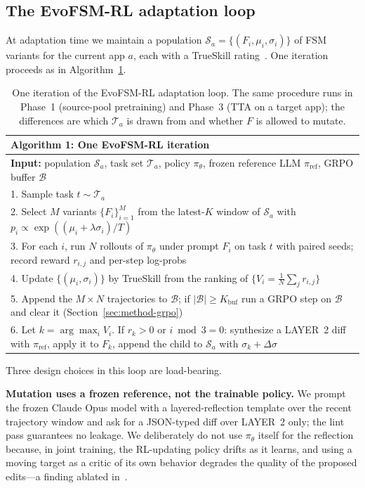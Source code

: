 \subsection{The EvoFSM-RL adaptation loop}
\label{sec:method-loop}

At adaptation time we maintain a population $\mathcal{S}_a = \{(F_i, \mu_i,
\sigma_i)\}$ of FSM variants for the current app $a$, each with a TrueSkill
rating~\citep{herbrich2007trueskill}. One iteration proceeds as in
Algorithm~\ref{alg:evofsmrl}.

\begin{table}[t]
\small
\centering
\begin{tabular}{p{}}
\hline
\textbf{Algorithm 1: One EvoFSM-RL iteration} \\
\hline
\textbf{Input:} population $\mathcal{S}_a$, task set $\mathcal{T}_a$, policy
$\pi_\theta$, frozen reference LLM $\pi_{\text{ref}}$, GRPO buffer $\mathcal{B}$ \\
\hline
1. Sample task $t \sim \mathcal{T}_a$ \\
2. Select $M$ variants $\{F_i\}_{i=1}^M$ from the latest-$K$ window of
$\mathcal{S}_a$ with $p_i \propto \exp((\mu_i + \lambda\sigma_i)/T)$ \\
3. For each $i$, run $N$ rollouts of $\pi_\theta$ under prompt $F_i$ on task $t$
with paired seeds; record reward $r_{i,j}$ and per-step log-probs \\
4. Update $\{(\mu_i, \sigma_i)\}$ by TrueSkill from the ranking of $\{V_i =
\tfrac{1}{N}\sum_j r_{i,j}\}$ \\
5. Append the $M{\times}N$ trajectories to $\mathcal{B}$; if $|\mathcal{B}| \ge
K_{\text{buf}}$ run a GRPO step on $\mathcal{B}$ and clear it
(Section~\ref{sec:method-grpo}) \\
6. Let $k = \arg\max_i V_i$. If $r_k > 0$ or $i \bmod 3 = 0$: synthesize a
LAYER~2 diff with $\pi_{\text{ref}}$, apply it to $F_k$, append the child to
$\mathcal{S}_a$ with $\sigma_k + \Delta\sigma$ \\
\hline
\end{tabular}
\caption{One iteration of the EvoFSM-RL adaptation loop. The same procedure runs
in Phase~1 (source-pool pretraining) and Phase~3 (TTA on a target app); the
differences are which $\mathcal{T}_a$ is drawn from and whether $F$ is allowed
to mutate.}
\label{alg:evofsmrl}
\end{table}

Three design choices in this loop are load-bearing.

\textbf{Mutation uses a frozen reference, not the trainable policy.} We prompt
the frozen Claude Opus model with a layered-reflection template over the recent
trajectory window and ask for a JSON-typed diff over LAYER~2 only; the lint pass
guarantees no leakage. We deliberately do not use $\pi_\theta$ itself for the
reflection because, in joint training, the RL-updating policy drifts as it
learns, and using a moving target as a critic of its own behavior degrades the
quality of the proposed edits---a finding ablated in~\citet{zhang2026espl}.


